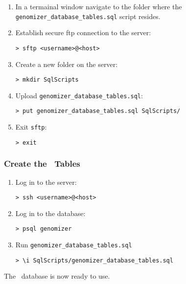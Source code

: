     \begin{enumerate}

      \item In a termainal window navigate to the folder where the \verb+genomizer_database_tables.sql+ script resides.

      \item Establish secure ftp connection to the server:
      \begin{verbatim}
> sftp <username>@<host>
      \end{verbatim}

      \item Create a new folder on the server:
      \begin{verbatim}
> mkdir SqlScripts
      \end{verbatim}

      \item Upload \verb+genomizer_database_tables.sql+:
      \begin{verbatim}
> put genomizer_database_tables.sql SqlScripts/
      \end{verbatim}

      \item Exit \texttt{sftp}:
      \begin{verbatim}
> exit
      \end{verbatim}

    \end{enumerate}

    \subsubsection{Create the \appName\ Tables}

    \begin{enumerate}

      \item Log in to the server:
      \begin{verbatim}
> ssh <username>@<host>
      \end{verbatim}

      \item Log in to the database:
      \begin{verbatim}
> psql genomizer
      \end{verbatim}

      \item Run \verb+genomizer_database_tables.sql+
      \begin{verbatim}
> \i SqlScripts/genomizer_database_tables.sql
      \end{verbatim}


    \end{enumerate}

The \appName\ database is now ready to use.
